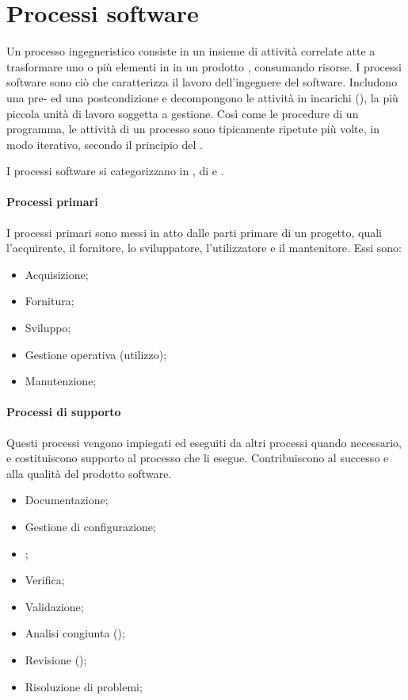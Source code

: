 \section{Processi software}

Un \gls{processo} ingegneristico consiste in un insieme di attività correlate
atte a trasformare uno o più elementi in  in un prodotto
, consumando risorse. I processi software sono ciò che
caratterizza il lavoro dell'ingegnere del software. Includono una pre- ed una
postcondizione e decompongono le attività in incarichi (), la più
piccola unità di lavoro soggetta a gestione. Così come le procedure di un
programma, le attività di un processo sono tipicamente ripetute più volte, in
modo iterativo, secondo il principio del .


I processi software si categorizzano in , di  e
.

\paragraph{Processi primari}

I processi primari sono messi in atto dalle parti primare di un progetto, quali
l'acquirente, il fornitore, lo sviluppatore, l'utilizzatore e il mantenitore.
Essi sono:

\begin{itemize}
	\item Acquisizione;
	\item Fornitura;
	\item Sviluppo;
	\item Gestione operativa (utilizzo);
	\item Manutenzione;
\end{itemize}

\paragraph{Processi di supporto}

Questi processi vengono impiegati ed eseguiti da altri processi quando
necessario, e costituiscono supporto al processo che li esegue. Contribuiscono
al successo e alla qualità del prodotto software.

\begin{itemize}
	\item Documentazione;
	\item Gestione di configurazione;
	\item {};
	\item Verifica;
	\item Validazione;
	\item Analisi congiunta ();
	\item Revisione ();
	\item Risoluzione di problemi;
\end{itemize}

